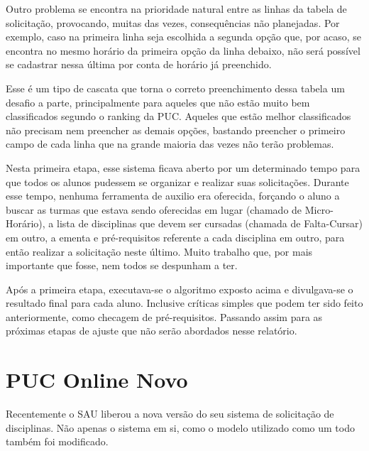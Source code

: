 \documentclass[graduacao,brazil]{ThesisPUC}
\begin{document}
Outro problema se encontra na prioridade natural entre as linhas da tabela de solicitação, provocando, muitas das vezes, consequências não planejadas. Por exemplo, caso na primeira linha seja escolhida a segunda opção que, por acaso, se encontra no mesmo horário da primeira opção da linha debaixo, não será possível se cadastrar nessa última por conta de horário já preenchido.

Esse é um tipo de cascata que torna o correto preenchimento dessa tabela um desafio a parte, principalmente para aqueles que não estão muito bem classificados segundo o ranking da PUC. Aqueles que estão melhor classificados não precisam nem preencher as demais opções, bastando preencher o primeiro campo de cada linha que na grande maioria das vezes não terão problemas.

Nesta primeira etapa, esse sistema ficava aberto por um determinado tempo para que todos os alunos pudessem se organizar e realizar suas solicitações. Durante esse tempo, nenhuma ferramenta de auxilio era oferecida, forçando o aluno a buscar as turmas que estava sendo oferecidas em lugar (chamado de Micro-Horário), a lista de disciplinas que devem ser cursadas (chamada de Falta-Cursar) em outro, a ementa e pré-requisitos referente a cada disciplina em outro, para então realizar a solicitação neste último. Muito trabalho que, por mais importante que fosse, nem todos se despunham a ter.

Após a primeira etapa, executava-se o algoritmo exposto acima e divulgava-se o resultado final para cada aluno. Inclusive críticas simples que podem ter sido feito anteriormente, como checagem de pré-requisitos. Passando assim para as próximas etapas de ajuste que não serão abordados nesse relatório.


\section{PUC Online Novo}

Recentemente o SAU liberou a nova versão do seu sistema de solicitação de disciplinas. Não apenas o sistema em si, como o modelo utilizado como um todo também foi modificado.
\end{document}
